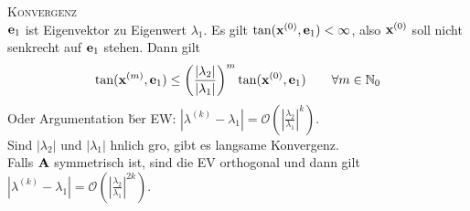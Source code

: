 %

\textsc{Konvergenz}\\
$\mbox{\bf e}_1$ ist Eigenvektor zu Eigenwert $\lambda_1$. Es gilt $\tan(\mbox{\bf x}^{(0)}, \mbox{\bf e}_1) < \infty$, also $\mbox{\bf x}^{(0)}$ soll nicht senkrecht auf $\mbox{\bf e}_1$ stehen. Dann gilt 
\begin{align*}
\tan(\mbox{\bf x}^{(m)}, \mbox{\bf e}_1) \leq \left(\frac{|\lambda_2|}{|\lambda_1|}\right)^m \tan(\mbox{\bf x}^{(0)}, \mbox{\bf e}_1) \qquad \forall m \in \mathbb{N}_0
\end{align*}
Oder Argumentation \u ber EW: $|\lambda^{(k)} - \lambda_1| = \mathcal{O}\left(\left|\frac{\lambda_2}{\lambda_1}\right|^k\right)$. \\
Sind $|\lambda_2|$ und $|\lambda_1|$ \a hnlich gro\s  , gibt es langsame Konvergenz.\\
Falls $\mbox{\bf A}$ symmetrisch ist, sind die EV orthogonal und dann gilt $|\lambda^{(k)} - \lambda_1| = \mathcal{O}\left(\left|\frac{\lambda_2}{\lambda_1}\right|^{2k}\right)$.

